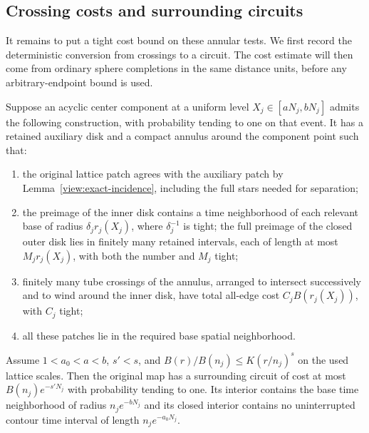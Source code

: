 \subsection{Crossing costs and surrounding circuits}

It remains to put a tight cost bound on these annular tests.  We first
record the deterministic conversion from crossings to a circuit.
The cost estimate will then come from ordinary sphere completions in
the same distance units, before any arbitrary-endpoint bound is used.

\begin{proposition}
\label{view:annulus-to-circuit}
Suppose an acyclic center component at a uniform level
$X_j\in[aN_j,bN_j]$ admits the following construction, with probability
tending to one on that event.  It has a retained auxiliary disk and a
compact annulus around the component point such that:
\begin{enumerate}[label=(\roman*)]
\item the original lattice patch agrees with the auxiliary patch by
Lemma~\ref{view:exact-incidence}, including the full stars needed for
separation;
\item the preimage of the inner disk contains a time neighborhood of each
relevant base of radius $\delta_j r_j(X_j)$, where $\delta_j^{-1}$ is tight;
the full preimage of the closed outer disk lies in finitely many retained intervals,
each of length at most $M_j r_j(X_j)$, with both the number and $M_j$ tight;
\item finitely many tube crossings of the annulus, arranged to intersect
successively and to wind around the inner disk, have total all-edge cost
$C_j B(r_j(X_j))$, with $C_j$ tight;
\item all these patches lie in the required base spatial neighborhood.
\end{enumerate}
Assume $1<a_0<a<b$, $s'<s$, and
$B(r)/B(n_j)\le K(r/n_j)^s$ on the used lattice scales.
Then the original map has a surrounding circuit of cost at most
$B(n_j)e^{-s'N_j}$ with probability tending to one.  Its interior contains
the base time neighborhood of radius $n_j e^{-bN_j}$ and its closed
interior contains no
uninterrupted contour time interval of length $n_j e^{-a_0N_j}$.
\end{proposition}

